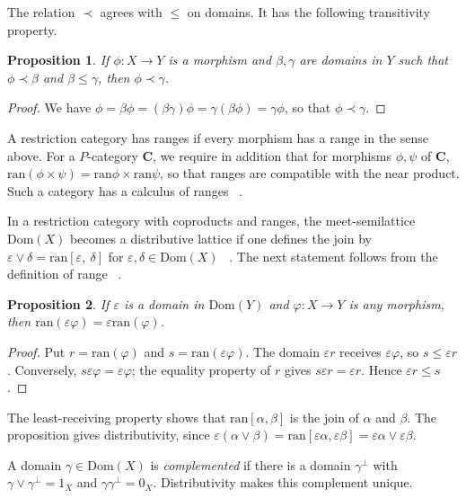 \documentclass[letterpaper,10pt]{amsart}
\theoremstyle{plain}
\newtheorem{prop}{Proposition}[thm]
\theoremstyle{definition}
\newcommand{\MAP}[3]{{#1}:{#2}\rightarrow{#3}}
\begin{document}
The relation $\prec$ agrees with $\le$ on domains. It has the following transitivity property.

\begin{prop}\label{PropRec}
If $\MAP{\phi}{X}{Y}$ is a morphism and $\beta,\gamma$ are domains
in $Y$ such that $\phi\prec\beta$ and $\beta\le\gamma$, then
$\phi\prec\gamma$.
\end{prop}
\begin{proof}
We have
$\phi=\beta\phi=(\beta\gamma)\phi=\gamma(\beta\phi)=\gamma\phi$,
so that $\phi\prec\gamma$. 
\end{proof}

A restriction category has ranges if every morphism has a range in the sense above.
For a $P$-category $\mathbf C$, we require in addition that
for morphisms $\phi,\psi$ of $\mathbf{C}$,
$\mathrm{ran}(\phi\times\psi)=\mathrm{ran}\phi\times\mathrm{ran}\psi$,
so that ranges are compatible with the near product. Such a category has a calculus of ranges
~\cite{MR92e:03067,MR88i:03078}. 

In a restriction category with coproducts and
ranges, the meet-semilattice $\mathrm{Dom}(X)$ becomes a
distributive lattice if one defines the join by
$\varepsilon\vee\delta=\mathrm{ran}[\varepsilon,\ \delta]$ for
$\varepsilon,\delta\in\mathrm{Dom}(X)$
~\cite{MR88i:03078,MR92e:03067}. The next statement follows
from the definition of range ~\cite[Proposition
5.4]{MR88i:03078}.

\begin{prop}\label{PropDomRan}
If $\varepsilon$ is a domain in $\mathrm{Dom}(Y)$ and
$\MAP{\varphi}{X}{Y}$ is any morphism, then
$\mathrm{ran}(\varepsilon\varphi)=\varepsilon
\mathrm{ran}(\varphi)$.
\end{prop}
\begin{proof}
Put $r=\mathrm{ran}(\varphi)$ and $s=\mathrm{ran}(\varepsilon\varphi)$.
The domain $\varepsilon r$ receives $\varepsilon\varphi$, so
$s\le\varepsilon r$. Conversely, $s\varepsilon\varphi=\varepsilon\varphi$;
the equality property of $r$ gives $s\varepsilon r=\varepsilon r$.
Hence $\varepsilon r\le s$.
\end{proof}

The least-receiving property shows that
$\mathrm{ran}[\alpha,\beta]$ is the join of $\alpha$ and $\beta$.
The proposition gives distributivity, since
$\varepsilon(\alpha\vee\beta)=\mathrm{ran}[\varepsilon\alpha,
\varepsilon\beta]=\varepsilon\alpha\vee\varepsilon\beta$.

A domain $\gamma\in\mathrm{Dom}(X)$ is \textit{complemented} if
there is a domain $\gamma^\perp$ with
$\gamma\vee\gamma^\perp=1_X$ and $\gamma\gamma^\perp=0_X$.
Distributivity makes this complement unique.
\end{document}
